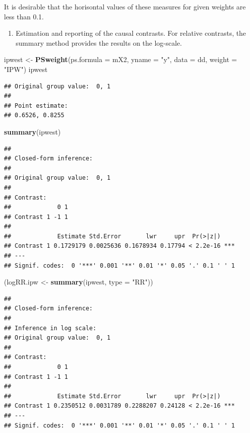 \documentclass[
]{book}
\newenvironment{Shaded}{\begin{snugshade}}{\end{snugshade}}
\newcommand{\AttributeTok}[1]{\textcolor[rgb]{0.13,0.29,0.53}{#1}}
\newcommand{\FunctionTok}[1]{\textcolor[rgb]{0.13,0.29,0.53}{\textbf{#1}}}
\newcommand{\NormalTok}[1]{#1}
\newcommand{\OtherTok}[1]{\textcolor[rgb]{0.56,0.35,0.01}{#1}}
\newcommand{\StringTok}[1]{\textcolor[rgb]{0.31,0.60,0.02}{#1}}
\providecommand{\tightlist}{%
  \setlength{\itemsep}{0pt}\setlength{\parskip}{0pt}}
\begin{document}
It is desirable that the horisontal values of these measures for given
weights are less than 0.1.

\begin{enumerate}
\def\labelenumi{\arabic{enumi}.}
\setcounter{enumi}{2}
\tightlist
\item
  Estimation and reporting of the causal contrasts. For relative
  contrasts, the summary method provides the results on the log-scale.
\end{enumerate}

\begin{Shaded}
\begin{Highlighting}[]
\NormalTok{ipwest }\OtherTok{\textless{}{-}} \FunctionTok{PSweight}\NormalTok{(}\AttributeTok{ps.formula =}\NormalTok{ mX2, }\AttributeTok{yname =} \StringTok{"y"}\NormalTok{, }\AttributeTok{data =}\NormalTok{ dd, }\AttributeTok{weight =} \StringTok{"IPW"}\NormalTok{)}
\NormalTok{ipwest}
\end{Highlighting}
\end{Shaded}

\begin{verbatim}
## Original group value:  0, 1 
## 
## Point estimate: 
## 0.6526, 0.8255
\end{verbatim}

\begin{Shaded}
\begin{Highlighting}[]
\FunctionTok{summary}\NormalTok{(ipwest)}
\end{Highlighting}
\end{Shaded}

\begin{verbatim}
## 
## Closed-form inference: 
## 
## Original group value:  0, 1 
## 
## Contrast: 
##             0 1
## Contrast 1 -1 1
## 
##             Estimate Std.Error       lwr     upr  Pr(>|z|)    
## Contrast 1 0.1729179 0.0025636 0.1678934 0.17794 < 2.2e-16 ***
## ---
## Signif. codes:  0 '***' 0.001 '**' 0.01 '*' 0.05 '.' 0.1 ' ' 1
\end{verbatim}

\begin{Shaded}
\begin{Highlighting}[]
\NormalTok{(logRR.ipw }\OtherTok{\textless{}{-}} \FunctionTok{summary}\NormalTok{(ipwest, }\AttributeTok{type =} \StringTok{"RR"}\NormalTok{))}
\end{Highlighting}
\end{Shaded}

\begin{verbatim}
## 
## Closed-form inference: 
## 
## Inference in log scale: 
## Original group value:  0, 1 
## 
## Contrast: 
##             0 1
## Contrast 1 -1 1
## 
##             Estimate Std.Error       lwr     upr  Pr(>|z|)    
## Contrast 1 0.2350512 0.0031789 0.2288207 0.24128 < 2.2e-16 ***
## ---
## Signif. codes:  0 '***' 0.001 '**' 0.01 '*' 0.05 '.' 0.1 ' ' 1
\end{verbatim}
\end{document}
